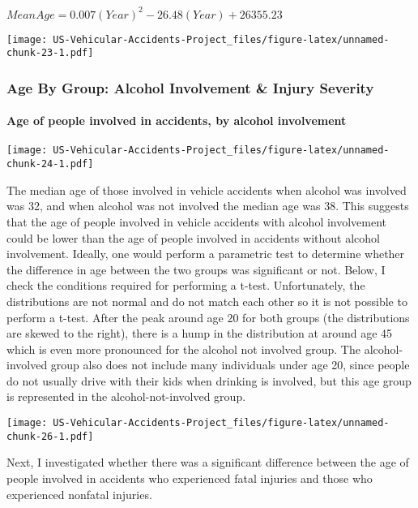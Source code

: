 \documentclass[]{article}
\let\oldparagraph\paragraph
\renewcommand{\paragraph}[1]{\oldparagraph{#1}\mbox{}}
\begin{document}
\(Mean Age = 0.007(Year)^2 - 26.48(Year) + 26355.23\)

\texttt{[image: US-Vehicular-Accidents-Project\_files/figure-latex/unnamed-chunk-23-1.pdf]}

\hypertarget{age-by-group-alcohol-involvement-injury-severity}{%
\subsubsection{Age By Group: Alcohol Involvement \& Injury
Severity}\label{age-by-group-alcohol-involvement-injury-severity}}

\hypertarget{age-of-people-involved-in-accidents-by-alcohol-involvement}{%
\paragraph{Age of people involved in accidents, by alcohol
involvement}\label{age-of-people-involved-in-accidents-by-alcohol-involvement}}

\texttt{[image: US-Vehicular-Accidents-Project\_files/figure-latex/unnamed-chunk-24-1.pdf]}

The median age of those involved in vehicle accidents when alcohol was
involved was 32, and when alcohol was not involved the median age was
38. This suggests that the age of people involved in vehicle accidents
with alcohol involvement could be lower than the age of people involved
in accidents without alcohol involvement. Ideally, one would perform a
parametric test to determine whether the difference in age between the
two groups was significant or not. Below, I check the conditions
required for performing a t-test. Unfortunately, the distributions are
not normal and do not match each other so it is not possible to perform
a t-test. After the peak around age 20 for both groups (the
distributions are skewed to the right), there is a hump in the
distribution at around age 45 which is even more pronounced for the
alcohol not involved group. The alcohol-involved group also does not
include many individuals under age 20, since people do not usually drive
with their kids when drinking is involved, but this age group is
represented in the alcohol-not-involved group.

\texttt{[image: US-Vehicular-Accidents-Project\_files/figure-latex/unnamed-chunk-26-1.pdf]}

Next, I investigated whether there was a significant difference between
the age of people involved in accidents who experienced fatal injuries
and those who experienced nonfatal injuries.
\end{document}
